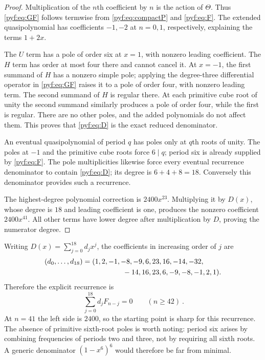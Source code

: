 \documentclass[11pt,a4paper]{article}
\numberwithin{equation}{section}
\theoremstyle{definition}
\begin{document}
\begin{proof}
Multiplication of the $n$th coefficient by $n$ is the action of $\Theta$.
Thus \eqref{pyf:eq:GF} follows termwise from \eqref{pyf:eq:compactP} and
\eqref{pyf:eq:F}. The extended quasipolynomial has coefficients $-1,-2$ at
$n=0,1$, respectively, explaining the terms $1+2x$.

The $U$ term has a pole of order six at $x=1$, with nonzero leading
coefficient. The $H$ term has order at most four there and cannot cancel
it. At $x=-1$, the first summand of $H$ has a nonzero simple pole;
applying the degree-three differential operator in \eqref{pyf:eq:GF} raises
it to a pole of order four, with nonzero leading term. The second summand
of $H$ is regular there. At each primitive cube root of unity the second
summand similarly produces a pole of order four, while the first is
regular. There are no other poles, and the added polynomials do not affect
them. This proves that \eqref{pyf:eq:D} is the exact reduced denominator.

An eventual quasipolynomial of period $q$ has poles only at $q$th roots
of unity. The poles at $-1$ and the primitive cube roots force $6\mid q$;
period six is already supplied by \eqref{pyf:eq:F}. The pole multiplicities
likewise force every eventual recurrence denominator to contain
\eqref{pyf:eq:D}; its degree is $6+4+8=18$. Conversely this denominator
provides such a recurrence.

The highest-degree polynomial correction is $2400x^{23}$. Multiplying
it by $D(x)$, whose degree is $18$ and leading coefficient is one,
produces the nonzero coefficient $2400x^{41}$. All other terms have lower
degree after multiplication by $D$, proving the numerator degree.
\end{proof}

Writing $D(x)=\sum_{j=0}^{18}d_jx^j$, the coefficients in increasing order
of $j$ are
\begin{equation}\label{pyf:eq:Dcoeff}
\begin{split}
(d_0,\ldots,d_{18})={}&(1,2,-1,-8,-9,6,23,16,-14,-32,\\
 &\hspace{15mm}-14,16,23,6,-9,-8,-1,2,1).
\end{split}
\end{equation}
Therefore the explicit recurrence is
\begin{equation}\label{pyf:eq:recurrence}
\boxed{\ \sum_{j=0}^{18}d_jF_{n-j}=0\qquad(n\geq42)\ }.
\end{equation}
At $n=41$ the left side is $2400$, so the starting point is sharp for this
recurrence. The absence of primitive sixth-root poles is worth noting:
period six arises by combining frequencies of periods two and three,
not by requiring all sixth roots. A generic denominator
$(1-x^6)^6$ would therefore be far from minimal.
\end{document}
